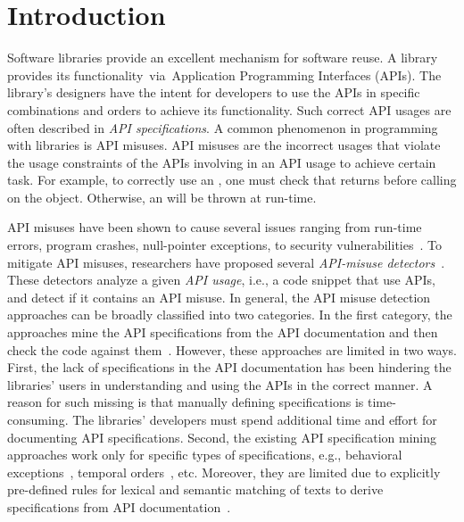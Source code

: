 \section{Introduction}
\label{sec:intro}

Software libraries provide an excellent mechanism for software
reuse. A library provides its functionality~via~Application
Programming Interfaces (APIs). The library's designers have the intent
for developers to use the APIs in specific combinations and orders to
achieve its functionality. Such correct API usages are often described
in {\em API specifications}. A common phenomenon in programming with
libraries is API misuses. API misuses are the incorrect usages that
violate the usage constraints of the APIs involving in an API usage to
achieve certain task.  For example, to correctly use an
, one must check that  returns
 before calling  on the
 object. Otherwise, an 
will be thrown at run-time.

API misuses have been shown to cause several issues ranging from
run-time errors, program crashes, null-pointer exceptions, to security
vulnerabilities~\cite{mudetect-msr19,MM13,SHA15,FHMB+12,EBFK13,NKMB16,GIJA+12,ANNN+16}. To
mitigate API misuses, researchers have proposed several
\emph{API-misuse
detectors}~\cite{LZ05,L07,WZL07,RGJ07,NNP+09,AX09,TX09,TX09b,WZ11,MM13,NPVN16}.
These detectors analyze a given \emph{API usage}, i.e., a code snippet
that use APIs, and detect if it contains an API misuse. In general,
the API misuse detection approaches can be broadly classified into two
categories. In the first category, the approaches mine the API
specifications from the API documentation and then check the code
against
them~\cite{ase22,jdoctor-issta18,zhou-icse17,c2s-fse20}. However,
these approaches are limited in two ways. First, the lack of
specifications in the API documentation has been hindering the
libraries' users in understanding and using the APIs in the correct
manner. A reason for such missing is that manually defining
specifications is time-consuming. The libraries' developers must spend
additional time and effort for documenting API specifications. Second,
the existing API specification mining approaches work only for
specific types of specifications, e.g., behavioral
exceptions~\cite{ase22}, temporal orders~\cite{icse17-nier},
etc. Moreover, they are limited due to explicitly pre-defined rules
for lexical and semantic matching of texts to derive specifications
from API documentation~\cite{zhou-icse17,jdoctor-issta18}.

